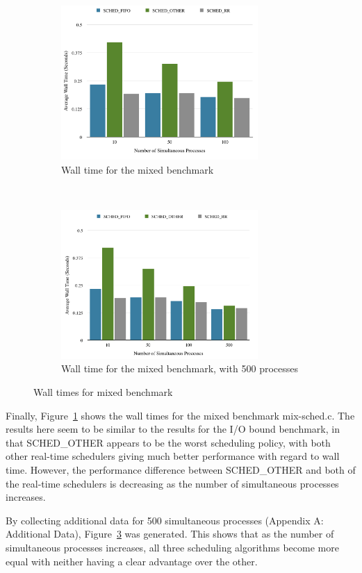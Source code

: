 \documentclass[12pt]{article}
\begin{document}
\begin{figure}[!htb]
  \centering
  \begin{subfigure}[t]{0.4\textwidth}
    \centering
    \includegraphics[width=75mm]{MixedWall.png}
    \caption{Wall time for the mixed benchmark}
    \label{fig:mixwall}
  \end{subfigure}
  ~
  \begin{subfigure}[t]{0.4\textwidth}
    \centering
    \includegraphics[width=75mm]{MixWallMore.png}
    \caption{Wall time for the mixed benchmark, with 500 processes}
    \label{fig:mixwallmore}
  \end{subfigure}
  \caption{Wall times for mixed benchmark}
\end{figure}

Finally, Figure~\ref{fig:mixwall} shows the wall times for the mixed benchmark
{\ttfamily mix-sched.c}. The results here seem to be similar to the results for
the I/O bound benchmark, in that {\ttfamily SCHED\_OTHER} appears to be the 
worst scheduling policy, with both other real-time schedulers giving much better
performance with regard to wall time. However, the performance difference 
between {\ttfamily SCHED\_OTHER} and both of the real-time schedulers is 
decreasing as the number of simultaneous processes increases.

By collecting additional data for 500 simultaneous processes (Appendix A:
Additional Data), Figure~\ref{fig:mixwallmore} was generated. This shows that as
the number of simultaneous processes increases, all three scheduling algorithms
become more equal with neither having a clear advantage over the other.
\end{document}

